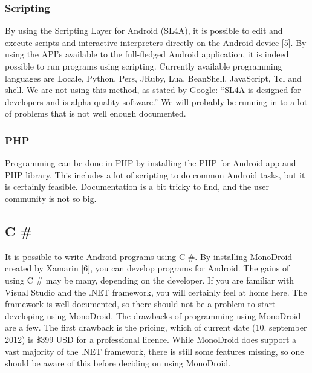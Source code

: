 \newpage
\subsubsection{Scripting}
By using the Scripting Layer for Android (SL4A), it is possible to edit and execute scripts and interactive interpreters directly on the Android device [5]. By using the API's available to the full-fledged Android application, it is indeed possible to run programs using scripting. Currently available programming languages are Locale, Python, Pers, JRuby, Lua, BeanShell, JavaScript, Tcl and shell. We are not using this method, as stated by Google: “SL4A is designed for developers and is alpha quality software.” We will probably be running in to a lot of problems that is not well enough documented.

\subsubsection{PHP}
Programming can be done in PHP by installing the PHP for Android app and PHP library. This includes a lot of scripting to do common Android tasks, but it is certainly feasible. Documentation is a bit tricky to find, and the user community is not so big.

\subsection{C \#}
It is possible to write Android programs using C \#. By installing MonoDroid created by Xamarin [6], you can develop programs for Android. The gains of using C \# may be many, depending on the developer. If you are familiar with Visual Studio and the .NET framework, you will certainly feel at home here. The framework is well documented, so there should not be a problem to start developing using MonoDroid.
\newline
\newline
The drawbacks of programming using MonoDroid are a few. The first drawback is the pricing, which of current date (10. september 2012) is \$399 USD for a professional licence. While MonoDroid does support a vast majority of the .NET framework, there is still some features missing, so one should be aware of this before deciding on using MonoDroid.






